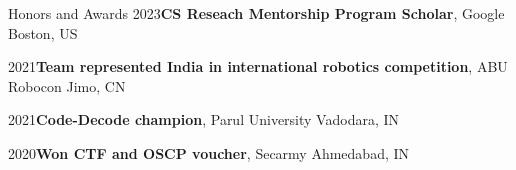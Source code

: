\documentclass{resume}
\begin{document}







\begin{rSection}{Honors and Awards} 
{2023\hspace{1em}}{\bf CS Reseach Mentorship Program Scholar}{, Google} \hfill Boston, US \vspace{-0.5em}

{2021\hspace{1em}}{\bf Team represented India in international robotics competition}{, ABU Robocon} \hfill Jimo, CN \vspace{-0.5em}

{2021\hspace{1em}}{\bf Code-Decode champion}{, Parul University} \hfill Vadodara, IN \vspace{-0.5em}

{2020\hspace{1em}}{\bf Won CTF and OSCP voucher}{, Secarmy} \hfill Ahmedabad, IN \vspace{-0.5em}


\end{rSection}
\end{document}
